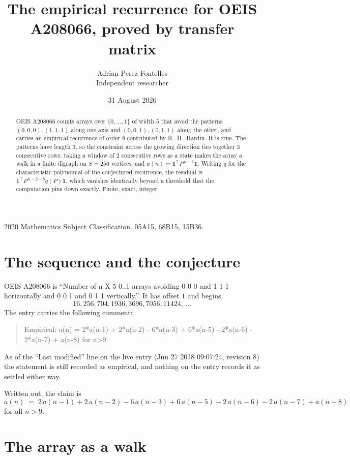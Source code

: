\documentclass[11pt,a4paper]{article}
\title{The empirical recurrence for OEIS A208066, proved by transfer matrix}
\author{Adrian Perez Fontelles\\ \small Independent researcher}
\date{31 August 2026}
\theoremstyle{plain}
\theoremstyle{definition}
\begin{document}
\maketitle

\begin{abstract}
OEIS A208066 counts arrays over $\{0,\dots,1\}$ of width $5$ that avoid the patterns
$(0,0,0), (1,1,1)$ along one axis and $(0,0,1), (0,1,1)$ along the other, and carries an empirical recurrence of
order $8$ contributed by R.~H.~Hardin. It is true. The patterns have length $3$, so
the constraint across the growing direction ties together $3$ consecutive rows: taking a
window of $2$ consecutive rows as a state makes the array a walk in a finite digraph
on $S=256$ vertices, and $a(n)=\mathbf{1}^{\!\top}P^{\,n-2}\mathbf{1}$. Writing $q$
for the characteristic polynomial of the conjectured recurrence, the residual is
$\mathbf{1}^{\!\top}P^{\,n-2-8}q(P)\mathbf{1}$, which vanishes identically
beyond a threshold that the computation pins down exactly. Finite, exact, integer.
\end{abstract}

\noindent\small 2020 Mathematics Subject Classification. 05A15, 68R15, 15B36.\normalsize

\section{The sequence and the conjecture}

OEIS A208066 is ``Number of n X 5 0..1 arrays avoiding 0 0 0 and 1 1 1 horizontally and 0 0 1 and 0 1 1 vertically.''. It has offset
$1$ and begins
\[
16, 256, 704, 1936, 3696, 7056, 11424,\ \dots
\]
The entry carries the following comment:
\begin{quote}\small
Empirical: a(n) = 2*a(n-1) + 2*a(n-2) - 6*a(n-3) + 6*a(n-5) - 2*a(n-6) - 2*a(n-7) + a(n-8) for n>9.
\end{quote}
As of the ``Last modified'' line on the live entry (Jun 27 2018 09:07:24, revision
8) the statement is still recorded as empirical, and nothing on the entry
records it as settled either way.

Written out, the claim is
\begin{equation}\label{eq:conj}
a(n)\;=\;2\,a(n-1) + 2\,a(n-2) - 6\,a(n-3) + 6\,a(n-5) - 2\,a(n-6) - 2\,a(n-7) + a(n-8)
\end{equation}
for all $n>9$. 

\section{The array as a walk}
\end{document}
